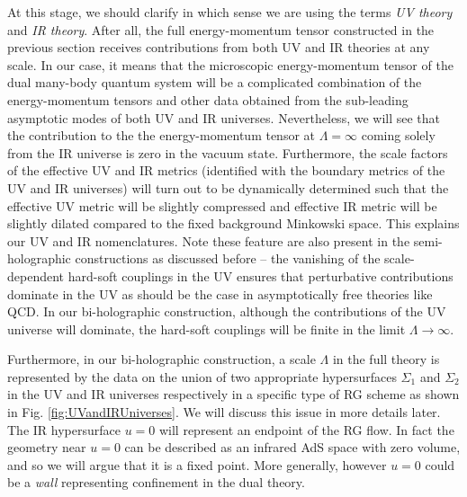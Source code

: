 \documentclass[prd,reprint,a4paper,showpacs,superscriptaddress,11pt,onecolumn,nofootinbib]{revtex4-1}
\renewcommand{\(}{\left(}
\renewcommand{\)}{\right)}
\newcommand{\6}{\partial}
\begin{document}
At this stage, we should clarify in which sense we are using the terms \textit{UV theory} and \textit{IR theory}. After all, the full energy-momentum tensor constructed in the previous section  receives contributions from both UV and IR theories at any scale. In our case, it means that the microscopic energy-momentum tensor of the dual many-body quantum system will be a complicated combination of the energy-momentum tensors and other data obtained from the sub-leading asymptotic modes of both UV and IR universes. Nevertheless, we will see that the contribution to the the energy-momentum tensor at $\Lambda = \infty$ coming solely from the IR universe is zero in the vacuum state. Furthermore, the scale factors of the effective UV and IR metrics (identified with the boundary metrics of the UV and IR universes) will turn out to be dynamically determined such that the effective UV metric will be slightly compressed and effective IR metric will be slightly dilated compared to the fixed background Minkowski space. This explains our UV and IR nomenclatures. Note these feature are also present in the semi-holographic constructions as discussed before -- the vanishing of the scale-dependent hard-soft couplings in the UV ensures that perturbative contributions dominate in the UV as should be the case in asymptotically free theories like  QCD. In our bi-holographic construction, although the contributions of the UV universe will dominate, the hard-soft couplings will be finite in the limit $\Lambda \rightarrow \infty$.

Furthermore, in our bi-holographic construction, a scale $\Lambda$ in the full theory is represented by the data on the union of two appropriate hypersurfaces $\Sigma_1$ and $\Sigma_2$ in the UV and IR universes respectively in a specific type of RG scheme as shown in Fig. \ref{fig:UVandIRUniverses}. We will discuss this issue in more details later. The IR hypersurface $u= 0$ will represent an endpoint of the RG flow. In fact the geometry near $u= 0$ can be described as an infrared AdS space with zero volume, and so we will argue that it is a fixed point. More generally, however $u= 0$ could be a \textit{wall} representing confinement in the dual theory. 
\end{document}
